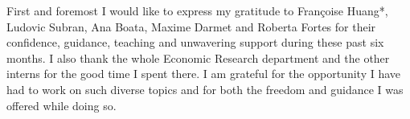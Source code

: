 First and foremost I would like to express my gratitude to Françoise Huang*, Ludovic Subran, Ana Boata, Maxime Darmet and Roberta Fortes for their confidence, guidance, teaching and unwavering support during these past six months. I also thank the whole Economic Research department and the other interns for the good time I spent there. I am grateful for the opportunity I have had to work on such diverse topics and for both the freedom and guidance I was offered while doing so. 